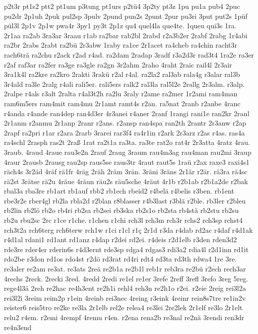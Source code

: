 {p2t3r
pt1s2
ptt2
pt1um
p3tung
pt1urs
p2tü4
3p2ty
pt3z
1pu
pu1a
pub4
2puc
pu2dr
2p1uh
2puk
pul2sp
3pulv
2pund
pun2s
2punt
2pur
pu3ri
3put
put2s
1püf
pül3l
2p1v
2p1w
pwa4r
3py1
py3t
2p1z
qu4
quel4la
que4te.
1queu
qui3s
1ra.
2r1aa
ra2ab
3ra3ar
3raau
r1ab
ra2bar
rab2bl
2rabd
r2a3b2er
2rabf
2rabg
1r4abi
ra2br
2rabs
2rabt
ra2bü
2r3abw
1raby
ra1ce
2r1acet
ra4cheb
ra4chin
racht3r
rach6trä
ra2chu
r2ack
r2ad
r4ad.
ra2dam
2radap
3radf
r3a2d3r
rad3t4
1ra2e
ra3er
r2af
raf3ar
ra2fer
ra3ge
ra3gle
ra2gn
3r2ahm
2raho
4raht
2raic
rail4l
2r3air
3ra1k4l
ra2kre
ra2kro
2rakti
3rakü
r2al
r4al.
ra2la2
ral3ab
rala4g
r3alar
ral3b
3r4ald
ra3le
2ralg
r4ali
rali5er.
rali5ers
ralk2
ral3la
ral5l2e
2rallg
2r3alm.
r3alp.
2ralpe
r4als
r3alt
2ralta
r4al3t2h
ra2lu
3raly
r2ame
ra2mer
1r2ami
ram4man
ram6m5ers
ram4mit
ram4mu
2r1amt
ramt4s
r2an.
ra5nat
2ranb
r2anbe
4ranc
r4anda
r4ande
ran4dep
ran4d3er
4r3anei
r4aner
2ranf
1rangi
rani1e
ran2kr
2ranl
2r1anm
r2anmu
2r1anp
2ranr
r2ans.
r2ansp
ran4spa
ran2th
2rantr
2r3anw
r2ap
2rapf
ra2pri
r1ar
r2ara
2rarb
3rarei
rar3f4
ra4r1in
r2ark
2r3arz
r2as
r4as.
ras4a
ra4schl
2rasph
ras2t
2raß
1rat
ra2t1a
ra3ta.
ra3te
rat2o
rat4r
2r3atta
4ratz
4rau.
3raub.
4raud
4raue
rau3e2n
2rauf
2raug
3raum
rau4m3ag
rau4man
rau2mi
3raup
4raur
2rausb
2rausg
rau2sp
raus5se
raus3tr
4raut
raut5s
1raü
r2ax
raxe3
raxi4s1
räch4s
3r2äd
4räf
rä1fr
4räg
2räh
2räm
3rän.
3räni
3räns
2r1är
r2är.
rä3ra
rä4sc
rä2st
3rätse
rä2u
4räue
4räun
räu2s
räu5sche
4räut
4r1b
r2b1ab
r2b1a2de
r2bak
rbal3a
rba3re
rb1art
rb1auf
rbb2
rb1ech
rbeid2
r4belä
r4belis
r3ben.
rb1ent
rbe3r2e
rber4gl
rb2la
rbla2d
r2blan
r8blasser
r4b3last
r3blä
r2ble.
rb3ler
r2bleu
rb2lin
rb2lö
rb2o
rb4ri
rb2sa
rb2sei
rb3ska
rb2s1o
rb2sta
rb4stä
rb2stu
rb2su
rb2u
rbu2sc
2rc
r1ce
r1che.
r1chen
r1chi
rch3l
rch3m
rch3r
rchs2
rch3sp
rchst4
rch3t2a
rch6terg
rch6terw
rch1w
r1ci
r1cl
r1ç
2r1d
r3da
r4dab
rd2ac
r4daf
r4d1ak
r4d1al
rdani1
rd1ant
rd1anz
r4dap
r2dei
rd2ei.
r4deis
r2d1elb
r3den
rden3d2
rde3re
rder4er
rderin6s
r4d3ernt
rde3sp
rdga4
rdgas3
rdi3a2
rdia4l
r2d1inn
rd1it
rdo2be
r3don
rd1os
rdo4st
r2dö
rd3rat
rd4ri
rdt4
rd3ta
rd3th
rdwa4
1re
3re.
re3aler
re2am
re3at.
re3ats
2reä
re2b1a
re2b1l
reb1r
reb3ra
re2bü
r2ech
rech3ar
4rechs
2reck.
2recki
3red.
4redd
2redi
re1el
re1er
3refe
2reff
3refl
3refo
3reg
5reg.
rege4l3ä
2reh
re2hac
re4h3ent
re2h1i
rehl4
reh3n
re2h1o
r2ei.
r2eie
2reig
rei3l2a
rei3l2i
3reim
reim2p
r1ein
4reinb
rei3nec
4reing
r3eink
4reinr
rein8s7tre
re1in2v
reister6
reis5tro
re2ke
re3la
2r1elb
rel2e
relea4
re3lei
2re2lek
2r1elf
re3lo
2r1elt
relu2
r4em.
r2emi
4rempf
4remu
r4en.
r2ena
rena2b
re3nal
re2nä
3rendi
ren3dr
re4n3end
}
